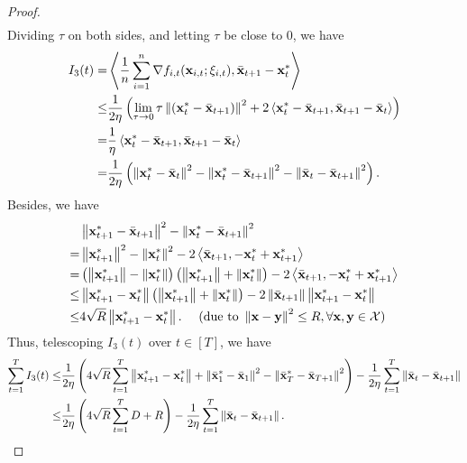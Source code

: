 \documentclass{article}
\begin{document}
\begin{proof}
\begin{align}
\end{align} Dividing $\tau$ on both sides, and letting $\tau$ be close to $0$, we have
\begin{align}
\nonumber
I_3(t) = & \left\langle\frac{1}{n}\sum_{i=1}^n \nabla f_{i,t}({\bf x}_{i,t};\xi_{i,t}), \bar{{\bf x}}_{t+1} - {\bf x}_t^\ast \right\rangle \\ \nonumber 
\le & \frac{1}{2\eta}\left(  \lim_{\tau \rightarrow 0}\tau \left\lVert\left( {\bf x}_t^\ast - \bar{{\bf x}}_{t+1} \right)\right\rVert^2 + 2\left\langle {\bf x}_t^\ast - \bar{{\bf x}}_{t+1}, \bar{{\bf x}}_{t+1} - \bar{{\bf x}}_t  \right\rangle  \right) \\ \nonumber
= & \frac{1}{\eta}\left\langle {\bf x}_t^\ast - \bar{{\bf x}}_{t+1}, \bar{{\bf x}}_{t+1} - \bar{{\bf x}}_t  \right\rangle \\ \label{equa_I3_temp}
= & \frac{1}{2\eta}\left(  \left\lVert{\bf x}_t^\ast - \bar{{\bf x}}_t\right\rVert^2 - \left\lVert{\bf x}_t^\ast - \bar{{\bf x}}_{t+1}\right\rVert^2 - \left\lVert\bar{{\bf x}}_t - \bar{{\bf x}}_{t+1}\right\rVert^2  \right). 
\end{align} Besides, we have
\begin{align}
\nonumber
& \left\lVert{\bf x}_{t+1}^\ast - \bar{{\bf x}}_{t+1}\right\rVert^2 - \left\lVert{\bf x}_t^\ast - \bar{{\bf x}}_{t+1}\right\rVert^2 \\ \nonumber 
= & \left\lVert{\bf x}_{t+1}^\ast\right\rVert^2 - \left\lVert{\bf x}_t^\ast\right\rVert^2 - 2\left\langle\bar{{\bf x}}_{t+1}, -{\bf x}_t^\ast + {\bf x}_{t+1}^\ast \right\rangle \\ \nonumber
= & \left( \left\lVert{\bf x}_{t+1}^\ast\right\rVert - \left\lVert{\bf x}_t^\ast\right\rVert \right) \left( \left\lVert{\bf x}_{t+1}^\ast\right\rVert + \left\lVert{\bf x}_t^\ast\right\rVert \right) - 2\left\langle\bar{{\bf x}}_{t+1}, -{\bf x}_t^\ast + {\bf x}_{t+1}^\ast \right\rangle \\ \nonumber
\le & \left\lVert{\bf x}_{t+1}^\ast - {\bf x}_t^\ast\right\rVert \left( \left\lVert{\bf x}_{t+1}^\ast\right\rVert + \left\lVert{\bf x}_t^\ast\right\rVert \right) - 2\left\lVert\bar{{\bf x}}_{t+1}\right\rVert \left\lVert{\bf x}_{t+1}^\ast-{\bf x}_t^\ast\right\rVert \\ \nonumber
\le & 4\sqrt{R}\left\lVert{\bf x}_{t+1}^\ast - {\bf x}_t^\ast\right\rVert.    ~~~~(\text{due to } \left\lVert{\bf x} - {\bf y}\right\rVert^2 \le R, \forall {\bf x}, {\bf y}\in{\mathcal{X}}) 
\end{align} Thus, telescoping $I_3(t)$ over $t\in[T]$, we have 
\begin{align}
\nonumber
\sum_{t=1}^T I_3(t) \le & \frac{1}{2\eta}\left(  4\sqrt{R}\sum_{t=1}^T\left\lVert{\bf x}_{t+1}^\ast - {\bf x}_t^\ast\right\rVert + \left\lVert\bar{{\bf x}}_1^\ast - \bar{{\bf x}}_1\right\rVert^2 - \left\lVert\bar{{\bf x}}_T^\ast - \bar{{\bf x}}_{T+1}\right\rVert^2  \right) - \frac{1}{2\eta} \sum_{t=1}^T \left\lVert\bar{{\bf x}}_t - \bar{{\bf x}}_{t+1}\right\rVert \\ \nonumber
\le & \frac{1}{2\eta}\left(  4\sqrt{R}\sum_{t=1}^T D + R  \right) - \frac{1}{2\eta} \sum_{t=1}^T \left\lVert\bar{{\bf x}}_t - \bar{{\bf x}}_{t+1} \right\rVert.
\end{align} 



\end{proof}
\end{document}
